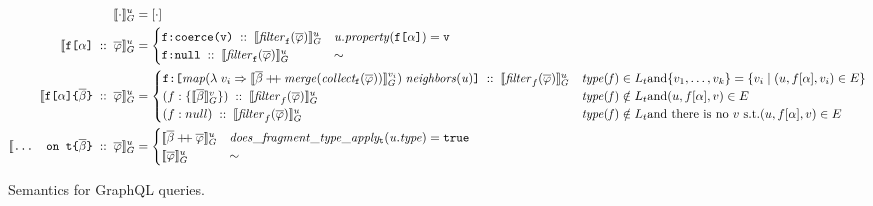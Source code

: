 \begin{figure}[h]
    \centering
    \begin{align}
    \llbracket \cdot \rrbracket^{u}_{G} &= [\cdot] \\
    \llbracket \texttt{f[}\alpha\texttt{]}\; ::\; \overline{\varphi} \rrbracket^{u}_{G} &= \begin{cases}
    \texttt{f}\texttt{:}\texttt{coerce(\texttt{v})} \; ::\; \llbracket \mathit{filter}_{\texttt{f}}(\overline{\varphi}) \rrbracket^{u}_{G}  & \mathit{u.property}(\texttt{f[}\alpha\texttt{]}) = \texttt{v} \\
    \texttt{f}\texttt{:}\texttt{null} \; :: \; \llbracket \mathit{filter}_{\texttt{f}}(\overline{\varphi}) \rrbracket^{u}_{G} & \sim
    \end{cases}\\
    \llbracket \texttt{f[}\alpha\texttt{]} \texttt{\{}\overline{\beta}\texttt{\}} \; ::\; \overline{\varphi} \rrbracket^{u}_{G} &=
    \begin{cases}
    \texttt{f}\texttt{:}\texttt{[} \mathit{map} (\lambda\; v_{i} \Rightarrow \llbracket \overline{\beta} \mathbin{+\mkern-5mu+} \mathit{merge (collect_{\texttt{f}} (\overline{\varphi}))} \rrbracket^{v_{i}}_{G})\; \mathit{neighbors(u)} \texttt{]} \; :: \; \llbracket \mathit{filter}_{f}(\overline{\varphi}) \rrbracket^{u}_{G}  & \mathit{type(f)} \in L_{t} \text{and} \{v_{1}, \ldots, v_{k}\} = \{v_{i} \mid (u, f[\alpha], v_{i}) \in E\} \\
    (f:\{\llbracket \overline{\beta} \rrbracket^{v}_{G}\})\; :: \; \llbracket \mathit{filter}_{f}(\overline{\varphi}) \rrbracket^{u}_{G}  & \mathit{type(f)} \notin L_{t} \text{and} (u, f[\alpha], v) \in E \\
    (f:null)\; :: \; \llbracket \mathit{filter}_{f}(\overline{\varphi}) \rrbracket^{u}_{G} & \mathit{type(f)} \notin L_{t} \text{and there is no } v \text{ s.t.} (u, f[\alpha], v) \in E \\
    \end{cases}\\
    \llbracket \texttt{... on t}\texttt{\{}\overline{\beta}\texttt{\}}\; ::\; \overline{\varphi} \rrbracket^{u}_{G} &= \begin{cases}
    \llbracket \overline{\beta} \mathbin{+\mkern-5mu+} \overline{\varphi} \rrbracket^{u}_{G} & \mathit{does\_fragment\_type\_apply_{\texttt{t}}(u.type)} = \texttt{true}\\
    \llbracket \overline{\varphi} \rrbracket^{u}_{G} & \sim
    \end{cases}
    \end{align}
    \caption{Semantics for GraphQL queries.}
    \label{fig:semantics}
\end{figure}



